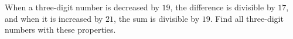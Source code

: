 When a three-digit number is decreased by $19$, the difference is divisible by $17$, and when it is increased by $21$, the sum is divisible by $19$. Find all three-digit numbers with these properties.
